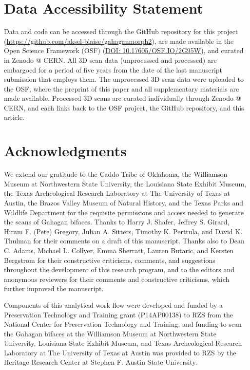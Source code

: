 \documentclass[review]{elsarticle}
\begin{document}
\section*{Data Accessibility Statement}

Data and code can be accessed through the GitHub repository for this project (\href{https://github.com/aksel-blaise/gahaganmorph2}{https://github.com/aksel-blaise/gahaganmorph2}), are made available in the Open Science Framework (OSF) (\href{https://osf.io/2g95w/}{DOI: 10.17605/OSF.IO/2G95W}), and curated in Zenodo @ CERN. All 3D scan data (unprocessed and processed) are embargoed for a period of five years from the date of the last manuscript submission that employs them. The unprocessed 3D scan data were uploaded to the OSF, where the preprint of this paper and all supplementary materials are made available. Processed 3D scans are curated individually through Zenodo @ CERN, and each links back to the OSF project, the GitHub repository, and this article.

\section*{Acknowledgments}

We extend our gratitude to the Caddo Tribe of Oklahoma, the Williamson Museum at Northwestern State University, the Louisiana State Exhibit Museum, the Texas Archeological Research Laboratory at The University of Texas at Austin, the Brazos Valley Museum of Natural History, and the Texas Parks and Wildlife Department for the requisite permissions and access needed to generate the scans of Gahagan bifaces. Thanks to Harry J. Shafer, Jeffrey S. Girard, Hiram F. (Pete) Gregory, Julian A. Sitters, Timothy K. Perttula, and David K. Thulman for their comments on a draft of this manuscript. Thanks also to Dean C. Adams, Michael L. Collyer, Emma Sherratt, Lauren Butaric, and Kersten Bergstrom for their constructive criticisms, comments, and suggestions throughout the development of this research program, and to the editors and anonymous reviewers for their comments and constructive criticisms, which further improved the manuscript.

Components of this analytical work flow were developed and funded by a Preservation Technology and Training grant (P14AP00138) to RZS from the National Center for Preservation Technology and Training, and funding to scan the Gahagan bifaces at the Williamson Museum at Northwestern State University, Louisiana State Exhibit Museum, and Texas Archeological Research Laboratory at The University of Texas at Austin was provided to RZS by the Heritage Research Center at Stephen F. Austin State University.


\end{document}
